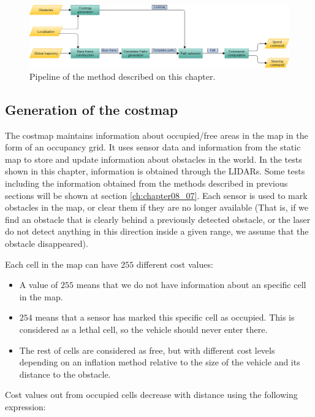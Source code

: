 \begin{figure}[h!]
        \centering
        \includegraphics[width=\textwidth]{pipeline}
        \caption{Pipeline of the method described on this chapter.}\label{fig:cp07_pipeline}
\end{figure}

\subsection{Generation of the costmap}\label{ch:chapter07_01_01}

The costmap maintains information about occupied/free areas in the map in the form of an occupancy grid. It uses sensor data and information from the static map to store and update information about obstacles in the world. In the tests shown in this chapter, information is obtained through the \acp{LIDAR}. Some tests including the information obtained from the methods described in previous sections will be shown at section \ref{ch:chapter08_07}. Each sensor is used to mark obstacles in the map, or clear them if they are no longer available (That is, if we find an obstacle that is clearly behind a previously detected obstacle, or the laser do not detect anything in this direction inside a given range, we assume that the obstacle disappeared).

Each cell in the map can have $255$ different cost values:
\begin{itemize}
 \item A value of $255$ means that we do not have information about an specific cell in the map.
 \item $254$ means that a sensor has marked this specific cell as occupied. This is considered as a lethal cell, so the vehicle should never enter there.
 \item The rest of cells are considered as free, but with different cost levels depending on an inflation method relative to the size of the vehicle and its distance to the obstacle.
\end{itemize}

Cost values out from occupied cells decrease with distance using the following expression:

